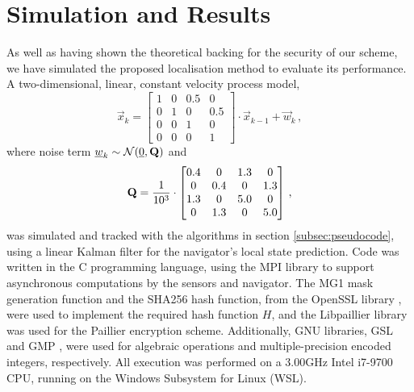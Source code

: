 \documentclass[10pt,letterpaper,oneside,twocolumn,journal]{IEEEtran}
\theoremstyle{definition}
\theoremstyle{definition}
\theoremstyle{remark}
\begin{document}
\section{Simulation and Results} \label{sec:sim_and_results}
As well as having shown the theoretical backing for the security of our scheme, we have simulated the proposed localisation method to evaluate its performance. A two-dimensional, linear, constant velocity process model,
\begin{equation*}
    \vec{x}_{k} = 
    \begin{bmatrix}
        1 & 0 & 0.5 & 0\\
        0 & 1 & 0 & 0.5\\
        0 & 0 & 1 & 0\\
        0 & 0 & 0 & 1
    \end{bmatrix} \cdot \vec{x}_{k-1} + \vec{w}_k\,,
\end{equation*}
where noise term ${\underline{w}}_k \sim \mathcal{N}({\underline{0}}, {{\mathbf{Q}}})$ and
\begin{equation*}
    {\ensuremath{{\mathbf{Q}}}} = \frac{1}{10^3} \cdot
    \begin{bmatrix}
        0.4 & 0 & 1.3 & 0\\
        0 & 0.4 & 0 & 1.3\\
        1.3 & 0 & 5.0 & 0\\
        0 & 1.3 & 0 & 5.0
    \end{bmatrix}\,,
\end{equation*}
was simulated and tracked with the algorithms in section \ref{subsec:pseudocode}, using a linear Kalman filter for the navigator's local state prediction. Code was written in the C programming language, using the MPI library \cite{theopenmpiprojectOpenMPI2020} to support asynchronous computations by the sensors and navigator. The MG1 mask generation function and the SHA256 hash function, from the OpenSSL library \cite{theopensslprojectOpenSSL2020}, were used to implement the required hash function $H$, and the Libpaillier library \cite{bethencourtLibpaillier2010} was used for the Paillier encryption scheme. Additionally, GNU libraries, GSL \cite{thegsldevelopmentteamGSLGNUScientific2019} and GMP \cite{granlundGMPGNUMultiple2020}, were used for algebraic operations and multiple-precision encoded integers, respectively. All execution was performed on a 3.00GHz Intel i7-9700 CPU, running on the Windows Subsystem for Linux (WSL).
\end{document}
